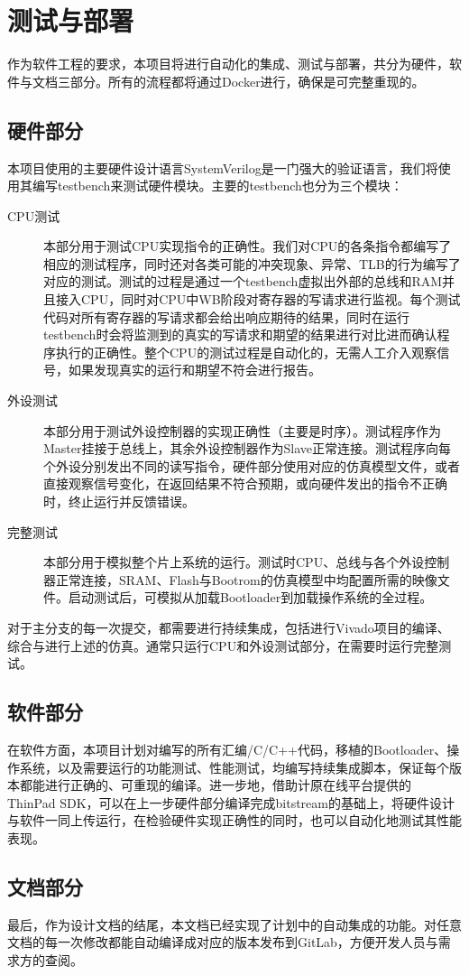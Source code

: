 \chapter{测试与部署}

作为软件工程的要求，本项目将进行自动化的集成、测试与部署，共分为硬件，软件与文档三部分。所有的流程都将通过Docker进行，确保是可完整重现的。

\section{硬件部分}

本项目使用的主要硬件设计语言SystemVerilog是一门强大的验证语言，我们将使用其编写testbench来测试硬件模块。主要的testbench也分为三个模块：

\begin{description}
    \item[CPU测试] 本部分用于测试CPU实现指令的正确性。我们对CPU的各条指令都编写了相应的测试程序，同时还对各类可能的冲突现象、异常、TLB的行为编写了对应的测试。测试的过程是通过一个testbench虚拟出外部的总线和RAM并且接入CPU，同时对CPU中WB阶段对寄存器的写请求进行监视。每个测试代码对所有寄存器的写请求都会给出响应期待的结果，同时在运行testbench时会将监测到的真实的写请求和期望的结果进行对比进而确认程序执行的正确性。整个CPU的测试过程是自动化的，无需人工介入观察信号，如果发现真实的运行和期望不符会进行报告。
    \item[外设测试] 本部分用于测试外设控制器的实现正确性（主要是时序）。测试程序作为Master挂接于总线上，其余外设控制器作为Slave正常连接。测试程序向每个外设分别发出不同的读写指令，硬件部分使用对应的仿真模型文件，或者直接观察信号变化，在返回结果不符合预期，或向硬件发出的指令不正确时，终止运行并反馈错误。
    \item[完整测试] 本部分用于模拟整个片上系统的运行。测试时CPU、总线与各个外设控制器正常连接，SRAM、Flash与Bootrom的仿真模型中均配置所需的映像文件。启动测试后，可模拟从加载Bootloader到加载操作系统的全过程。
\end{description}

对于主分支的每一次提交，都需要进行持续集成，包括进行Vivado项目的编译、综合与进行上述的仿真。通常只运行CPU和外设测试部分，在需要时运行完整测试。

\section{软件部分}

在软件方面，本项目计划对编写的所有汇编/C/C++代码，移植的Bootloader、操作系统，以及需要运行的功能测试、性能测试，均编写持续集成脚本，保证每个版本都能进行正确的、可重现的编译。进一步地，借助计原在线平台提供的 ThinPad SDK，可以在上一步硬件部分编译完成bitstream的基础上，将硬件设计与软件一同上传运行，在检验硬件实现正确性的同时，也可以自动化地测试其性能表现。

\section{文档部分}

最后，作为设计文档的结尾，本文档已经实现了计划中的自动集成的功能。对任意文档的每一次修改都能自动编译成对应的版本发布到GitLab，方便开发人员与需求方的查阅。
